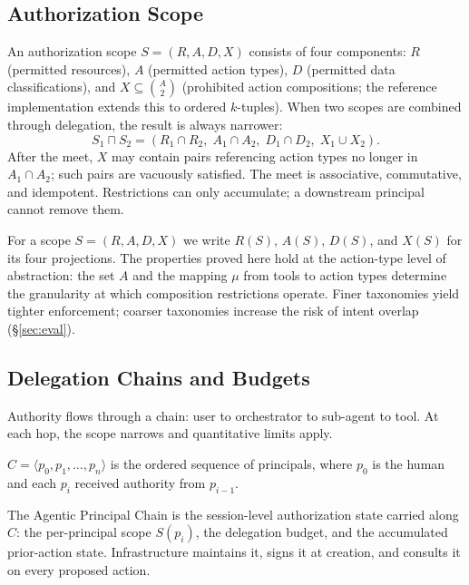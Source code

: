 \documentclass[sigconf,nonacm]{acmart}
\begin{document}
\subsection{Authorization Scope}\label{sec:scope}

\begin{definition}\label{def:scope}
An authorization scope $S = (R, A, D, X)$ consists of four components: $R$ (permitted resources), $A$ (permitted action types), $D$ (permitted data classifications), and $X \subseteq \binom{A}{2}$ (prohibited action compositions; the reference implementation extends this to ordered $k$-tuples). When two scopes are combined through delegation, the result is always narrower:
\[
S_1 \sqcap S_2 = (R_1 \cap R_2,\; A_1 \cap A_2,\; D_1 \cap D_2,\; X_1 \cup X_2).
\]
After the meet, $X$ may contain pairs referencing action types no longer in $A_1 \cap A_2$; such pairs are vacuously satisfied. The meet is associative, commutative, and idempotent. Restrictions can only accumulate; a downstream principal cannot remove them.
\end{definition}

For a scope $S = (R, A, D, X)$ we write $R(S)$, $A(S)$, $D(S)$, and $X(S)$ for its four projections. The properties proved here hold at the action-type level of abstraction: the set $A$ and the mapping $\mu$ from tools to action types determine the granularity at which composition restrictions operate. Finer taxonomies yield tighter enforcement; coarser taxonomies increase the risk of intent overlap (\S\ref{sec:eval}).

\subsection{Delegation Chains and Budgets}\label{sec:delegation}

Authority flows through a chain: user to orchestrator to sub-agent to tool. At each hop, the scope narrows and quantitative limits apply.

\begin{definition}\label{def:chain}
$C = \langle p_0, p_1, \ldots, p_n \rangle$ is the ordered sequence of principals, where $p_0$ is the human and each $p_i$ received authority from $p_{i-1}$.
\end{definition}

The Agentic Principal Chain is the session-level authorization state carried along $C$: the per-principal scope $S(p_i)$, the delegation budget, and the accumulated prior-action state. Infrastructure maintains it, signs it at creation, and consults it on every proposed action.
\end{document}

